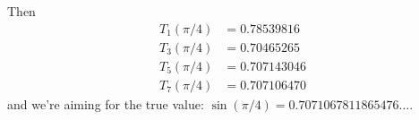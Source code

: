 \documentclass[11pt,a4paper]{scrartcl}
\begin{document}
\begin{enumerate}
    Then 
    \begin{align*}
        T_1(\pi/4) &= 0.78539816\\
        T_3(\pi/4) &= 0.70465265\\
        T_5(\pi/4) &= 0.707143046\\
        T_7(\pi/4) & =0.707106470    
    \end{align*}
    and we're aiming for the true value: $\sin(\pi/4) =    0.7071067811865476\dots$.
\end{enumerate}
\end{document}
